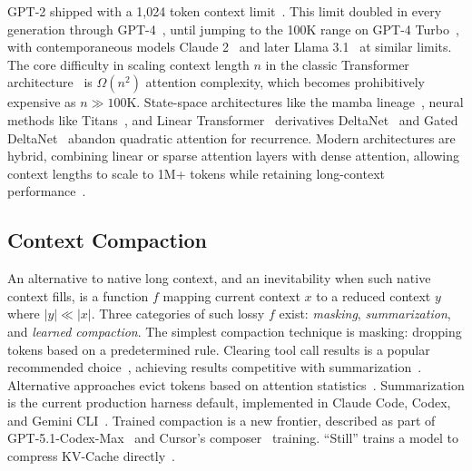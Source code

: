 GPT-2 shipped with a 1,024 token context limit~\citep{radford2019gpt2}. This limit doubled in every generation through GPT-4~\citep{brown2020gpt3,openai2022chatgpt,openai2023gpt4}, until jumping to the 100K range on GPT-4 Turbo~\citep{openai2023devday}, with contemporaneous models Claude 2~\citep{anthropic2023claude2} and later Llama 3.1~\citep{grattafiori2024llama3} at similar limits. The core difficulty in scaling context length $n$ in the classic Transformer architecture~\citep{vaswani2017attention} is $\Omega(n^2)$ attention complexity, which becomes prohibitively expensive as $n \gg 100$K. State-space architectures like the mamba lineage~\citep{gu2023mamba,dao2024mamba2,lahoti2026mamba3}, neural methods like Titans~\citep{behrouz2024titans}, and Linear Transformer~\citep{katharopoulos2020lineartransformers} derivatives DeltaNet~\citep{schlag2021fastweight} and Gated DeltaNet~\citep{yang2025gateddeltanet} abandon quadratic attention for recurrence. Modern architectures are hybrid, combining linear or sparse attention layers with dense attention, allowing context lengths to scale to 1M+ tokens while retaining long-context performance~\citep{qwen2026qwen35,kimiteam2026kimik3,deepseekai2025deepseekv32,glm5team2026glm5,nvidia2025nemotron3,gemmateam2024gemma2,mistral2024ministral}.

\subsection{Context Compaction}

An alternative to native long context, and an inevitability when such native context fills, is a function $f$ mapping current context $x$ to a reduced context $y$ where $|y| \ll |x|$. Three categories of such lossy $f$ exist: \emph{masking}, \emph{summarization}, and \emph{learned compaction}. The simplest compaction technique is masking: dropping tokens based on a predetermined rule. Clearing tool call results is a popular recommended choice~\citep{anthropic2025contextengineering}, achieving results competitive with summarization~\citep{deepseekai2025deepseekv32,lindenbauer2025complexitytrap}. Alternative approaches evict tokens based on attention statistics~\citep{xiao2023streamingllm,zhang2023h2o,li2024snapkv}. Summarization is the current production harness default, implemented in Claude Code, Codex, and Gemini CLI~\citep{anthropic2025contextengineering,openai2026codexrepo,google2026geminicli,barbaste2026harnessengineering}. Trained compaction is a new frontier, described as part of GPT-5.1-Codex-Max~\citep{openai2025codexmax} and Cursor's composer~\citep{cursor2026selfsummarization} training. ``Still'' trains a model to compress KV-Cache directly~\citep{oneill2026still}.

